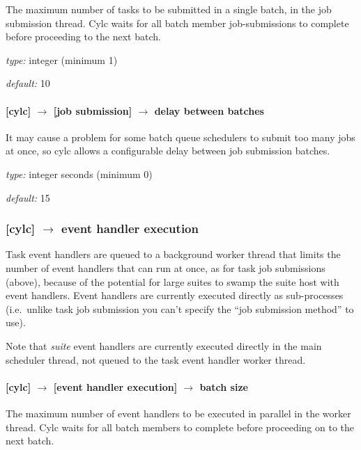 The maximum number of tasks to be submitted in a single batch, in the
job submission thread. Cylc waits for all batch member job-submissions
to complete before proceeding to the next batch.

\begin{myitemize}
    \item {\em type:} integer (minimum 1)
    \item {\em default:} 10
\end{myitemize}

\paragraph[delay between batches]{[cylc] $\rightarrow$ [job submission] $\rightarrow$ delay between batches}

It may cause a problem for some batch queue schedulers to submit too
many jobs at once, so cylc allows a configurable delay between job 
submission batches.

\begin{myitemize}
    \item {\em type:} integer seconds (minimum 0)
    \item {\em default:} 15
\end{myitemize}

\subsubsection[event handler execution]{[cylc] $\rightarrow$ event handler execution}

Task event handlers are queued to a background worker thread that limits
the number of event handlers that can run at once, as for task job
submissions (above), because of the potential for large suites to swamp
the suite host with event handlers. Event handlers are currently
executed directly as sub-processes (i.e.\ unlike task job submission you
can't specify the ``job submission method'' to use).

Note that {\em suite} event handlers are currently executed directly in
the main scheduler thread, not queued to the task event handler worker
thread.

\paragraph[batch size]{[cylc] $\rightarrow$ [event handler execution] $\rightarrow$ batch size}

The maximum number of event handlers to be executed in parallel in the
worker thread. Cylc waits for all batch members to complete before
proceeding on to the next batch.

